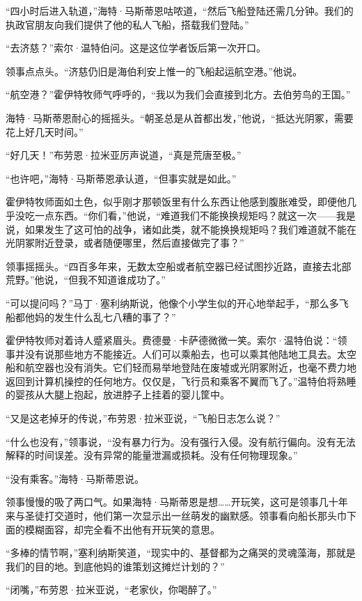 \documentclass[AutoFakeBold=true]{book}
\begin{document}
``四小时后进入轨道，''海特·马斯蒂恩咕哝道，``然后飞船登陆还需几分钟。我们的执政官朋友向我们提供了他的私人飞船，搭载我们登陆。''

``去济慈？''索尔·温特伯问。这是这位学者饭后第一次开口。

领事点点头。``济慈仍旧是海伯利安上惟一的飞船起运航空港。''他说。

``航空港？''霍伊特牧师气呼呼的，``我以为我们会直接到北方。去伯劳鸟的王国。''

海特·马斯蒂恩耐心的摇摇头。``朝圣总是从首都出发，''他说，``抵达光阴冢，需要花上好几天时间。''

``好几天！''布劳恩·拉米亚厉声说道，``真是荒唐至极。''

``也许吧，''海特·马斯蒂恩承认道，``但事实就是如此。''

霍伊特牧师面如土色，似乎刚才那顿饭里有什么东西让他感到腹胀难受，即便他几乎没吃一点东西。``你们看，''他说，``难道我们不能换换规矩吗？就这一次——我是说，如果发生了这可怕的战争，诸如此类，就不能换换规矩吗？我们难道就不能在光阴冢附近登录，或者随便哪里，然后直接做完了事？''

领事摇摇头。``四百多年来，无数太空船或者航空器已经试图抄近路，直接去北部荒野。''他说，``但我不知道谁成功了。''

``可以提问吗？''马丁·塞利纳斯说，他像个小学生似的开心地举起手，``那么多飞船都他妈的发生什么乱七八糟的事了？''

霍伊特牧师对着诗人蹙紧眉头。费德曼·卡萨德微微一笑。索尔·温特伯说：``领事并没有说那些地方不能接近。人们可以乘船去，也可以乘其他陆地工具去。太空船和航空器也没有消失。它们轻而易举地登陆在废墟或光阴冢附近，也毫不费力地返回到计算机操控的任何地方。仅仅是，飞行员和乘客不翼而飞了。''温特伯将熟睡的婴孩从大腿上抱起，放进脖子上挂着的婴儿筐中。

``又是这老掉牙的传说，''布劳恩·拉米亚说，``飞船日志怎么说？''

``什么也没有，''领事说，``没有暴力行为。没有强行入侵。没有航行偏向。没有无法解释的时间误差。没有异常的能量泄漏或损耗。没有任何物理现象。''

``没有乘客。''海特·马斯蒂恩说。

领事慢慢的吸了两口气。如果海特·马斯蒂恩是想……开玩笑，这可是领事几十年来与圣徒打交道时，他们第一次显示出一丝萌发的幽默感。领事看向船长那头巾下面的模糊面容，却完全看不出他有开玩笑的意思。

``多棒的情节啊，''塞利纳斯笑道，``现实中的、基督都为之痛哭的灵魂藻海，那就是我们的目的地。到底他妈的谁策划这摊烂计划的？''

``闭嘴，''布劳恩·拉米亚说，``老家伙，你喝醉了。''
\end{document}
